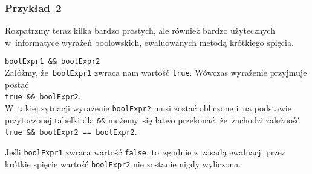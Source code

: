 \documentclass[10pt,t]{beamer}
\begin{document}
\begin{frame}
  \frametitle{Przykład~2}


  Rozpatrzmy teraz kilka bardzo prostych, ale również bardzo użytecznych
  w~informatyce wyrażeń boolowskich, ewaluowanych metodą krótkiego spięcia.

  \texttt{boolExpr1 \&\& boolExpr2} \\
  Załóżmy, że~\texttt{boolExpr1} zwraca nam wartość \texttt{true}. Wówczas
  wyrażenie przyjmuje postać \\
  \texttt{true \&\& boolExpr2}. \\
  W~takiej sytuacji wyrażenie \texttt{boolExpr2} musi zostać obliczone i~na
  podstawie przytoczonej tabelki dla \texttt{\&\&} możemy~się łatwo
  przekonać, że~zachodzi zależność \\
  \texttt{true \&\& boolExpr2 == boolExpr2}.

  Jeśli \texttt{boolExpr1} zwraca wartość \texttt{false}, to~zgodnie
  z~zasadą ewaluacji przez krótkie spięcie wartość \texttt{boolExpr2}
  nie zostanie nigdy wyliczona.

\end{frame}













































\end{document}
